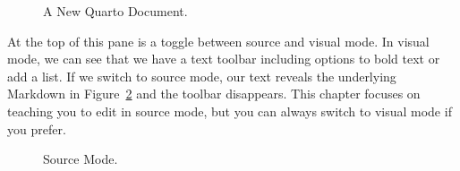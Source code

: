 \documentclass[
  letterpaper,
]{latex/krantz}
\begin{document}
\begin{figure}


\caption{\label{fig-quarto-file}A New Quarto Document.}

\end{figure}%

At the top of this pane is a toggle between source and visual mode. In
visual mode, we can see that we have a text toolbar including options to
bold text or add a list. If we switch to source mode, our text reveals
the underlying Markdown in Figure~\ref{fig-source-file} and the toolbar
disappears. This chapter focuses on teaching you to edit in source mode,
but you can always switch to visual mode if you prefer.

\begin{figure}


\caption{\label{fig-source-file}Source Mode.}

\end{figure}%
\end{document}
